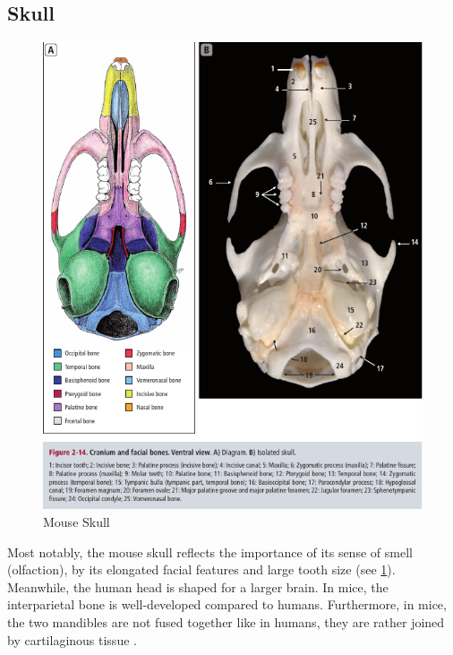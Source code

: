 \subsection{Skull}\label{s:b-mouse-skull}
\begin{figure}[h]
	\centerline{
		\includegraphics[scale=0.6]{images/mouseSkull.png}}
	\caption{Mouse Skull \cite{ruberteBridgingMouseHuman2023}}\label{fig:mouseSkull}
\end{figure}

\noindent
Most notably, the mouse skull reflects the importance of its sense of smell (olfaction),
by its elongated facial features and large tooth size (see \cref{fig:mouseSkull}).
Meanwhile, the human head is shaped for a larger brain.
In mice, the interparietal bone is well-developed compared to humans.
Furthermore, in mice, the two mandibles are not fused together like in humans,
they are rather joined by cartilaginous tissue \cite{jeromeSkeletalSystem2018,halleOpenAnatomyBrowser2017,platzerTaschenatlasAnatomieBd2013}.

